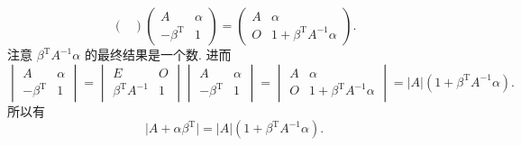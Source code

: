 \documentclass[UTF8,12pt,a4paper,fontset=fandol]{ctexart}
\begin{document}
\begin{solve}
\[\begin{pmatrix}
                \end{pmatrix} \begin{pmatrix}
                    A                   & \alpha \\
                    -\beta^{\mathrm{T}} & 1
                \end{pmatrix} = \begin{pmatrix}
                    A & \alpha                           \\
                    O & 1+\beta^{\mathrm{T}}A^{-1}\alpha
                \end{pmatrix}.\]
            注意 $\beta^{\mathrm{T}}A^{-1}\alpha$ 的最终结果是一个数. 进而
            \[\begin{vmatrix}
                    A                   & \alpha \\
                    -\beta^{\mathrm{T}} & 1
                \end{vmatrix} = \begin{vmatrix}
                    E                        & O \\
                    \beta^{\mathrm{T}}A^{-1} & 1
                \end{vmatrix} \begin{vmatrix}
                    A                   & \alpha \\
                    -\beta^{\mathrm{T}} & 1
                \end{vmatrix} = \begin{vmatrix}
                    A & \alpha                           \\
                    O & 1+\beta^{\mathrm{T}}A^{-1}\alpha
                \end{vmatrix} = \lvert A \rvert(1+\beta^{\mathrm{T}}A^{-1}\alpha).\]
            所以有
            \[\lvert A+\alpha \beta^{\mathrm{T}} \rvert = \lvert A \rvert(1+\beta^{\mathrm{T}}A^{-1}\alpha).\]
\end{solve}
\end{document}
